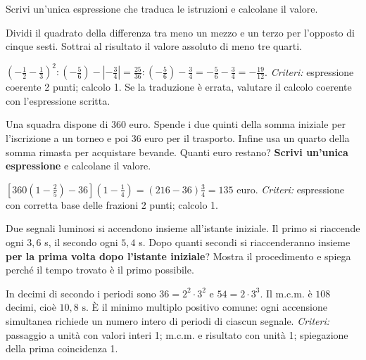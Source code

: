 \begin{esercizi}
\ifprintanswers\else\newpage\fi

\begin{esercizio}
\question[3] Scrivi un'unica espressione che traduca le istruzioni e calcolane il valore.

Dividi il quadrato della differenza tra meno un mezzo e un terzo per l'opposto di cinque sesti. Sottrai al risultato il valore assoluto di meno tre quarti.
\begin{solution}
$\left(-\frac12-\frac13\right)^2:\left(-\frac56\right)-\left|-\frac34\right|=\frac{25}{36}:(-\frac56)-\frac34=-\frac56-\frac34=\boxed{-\frac{19}{12}}$.
\textit{Criteri:} espressione coerente 2 punti; calcolo 1. Se la traduzione è errata, valutare il calcolo coerente con l'espressione scritta.
\end{solution}
\end{esercizio}

\begin{esercizio}
\question[3] Una squadra dispone di $360$ euro. Spende i due quinti della somma iniziale per l'iscrizione a un torneo e poi $36$ euro per il trasporto. Infine usa un quarto della somma rimasta per acquistare bevande. Quanti euro restano? \textbf{Scrivi un'unica espressione} e calcolane il valore.
\begin{solution}
$\left[360(1-\frac25)-36\right](1-\frac14)=(216-36)\frac34=\boxed{135\text{ euro}}$. \textit{Criteri:} espressione con corretta base delle frazioni 2 punti; calcolo 1.
\end{solution}
\end{esercizio}

\begin{esercizio}
\question[3] Due segnali luminosi si accendono insieme all'istante iniziale. Il primo si riaccende ogni $3{,}6$ s, il secondo ogni $5{,}4$ s. Dopo quanti secondi si riaccenderanno insieme \textbf{per la prima volta dopo l'istante iniziale}? Mostra il procedimento e spiega perché il tempo trovato è il primo possibile.
\begin{solution}
In decimi di secondo i periodi sono $36=2^2\cdot3^2$ e $54=2\cdot3^3$. Il m.c.m. è $108$ decimi, cioè $\boxed{10{,}8\text{ s}}$. È il minimo multiplo positivo comune: ogni accensione simultanea richiede un numero intero di periodi di ciascun segnale. \textit{Criteri:} passaggio a unità con valori interi 1; m.c.m. e risultato con unità 1; spiegazione della prima coincidenza 1.
\end{solution}
\end{esercizio}


\end{esercizi}
